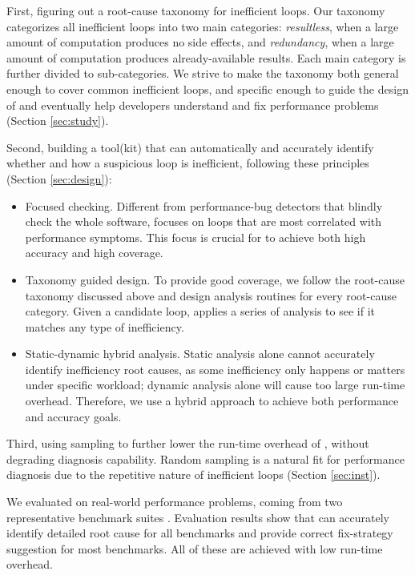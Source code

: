 First, figuring out a root-cause taxonomy for inefficient loops.
Our taxonomy categorizes all inefficient loops into two main categories:
\emph{resultless}, when a large amount of computation produces
no side effects, and \emph{redundancy}, when a large amount of 
computation produces already-available results.
Each main category is further divided to sub-categories.
We strive to make the taxonomy both general enough to cover
common inefficient loops, and specific enough to guide the design
of \Tool and eventually help developers understand
and fix performance problems
(Section \ref{sec:study}).
 
Second, building a tool(kit) \Tool that can automatically and accurately
identify whether and how a suspicious loop is inefficient, 
following these principles (Section \ref{sec:design}):

\begin{itemize}
\item Focused checking. 
Different from performance-bug detectors that blindly check the whole
software, \Tool focuses on loops that are
most correlated with performance symptoms. 
This focus is crucial for \Tool to achieve both high
accuracy and high coverage.

\item Taxonomy guided design. To provide good coverage, we follow
the root-cause taxonomy discussed above and design analysis routines for
every root-cause category. Given a candidate loop, \Tool
applies a series of analysis to see if it matches any type of inefficiency.

\item Static-dynamic hybrid analysis.
Static analysis alone cannot accurately identify 
inefficiency root causes, as some inefficiency only
happens or matters under specific workload; dynamic analysis alone will 
cause too large 
run-time overhead. Therefore, we use a hybrid approach to achieve both
performance and accuracy goals.
\end{itemize}

Third, using sampling to further lower the run-time overhead of \Tool, without
degrading diagnosis capability. Random sampling is a natural fit for performance
diagnosis due to the repetitive nature of inefficient loops (Section \ref{sec:inst}).

We evaluated \Tool on \allbugs real-world performance problems,
coming from two representative benchmark suites 
\cite{SongOOPSLA2014,Alabama}. 
Evaluation results show that \Tool can accurately identify detailed
root cause for all benchmarks and provide correct fix-strategy suggestion for
most benchmarks. All of these are achieved with low run-time overhead.
